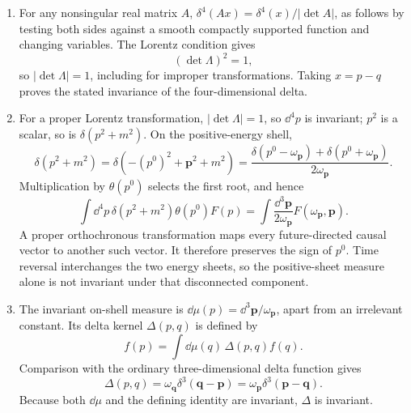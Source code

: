 
\begin{enumerate}
\begin{enumerate}
\item
For any nonsingular real matrix \(A\),
\(\delta^4(Ax)=\delta^4(x)/|\det A|\), as follows by testing both sides
against a smooth compactly supported function and changing variables.
The Lorentz condition gives
\[
 (\det\Lambda)^2=1,
\]
so \(|\det\Lambda|=1\), including for improper transformations.  Taking
\(x=p-q\) proves the stated invariance of the four-dimensional delta.
\item
For a proper Lorentz transformation,
\(\lvert\det\Lambda\rvert=1\), so \(\dd^4p\) is invariant; \(p^2\) is a
scalar, so is \(\delta(p^2+m^2)\).  On the positive-energy shell,
\[
 \delta(p^2+m^2)
 =\delta\!\left(-(p^0)^2+\mathbf p^2+m^2\right)
 =\frac{\delta(p^0-\omega_{\mathbf p})+\delta(p^0+\omega_{\mathbf p})}
 {2\omega_{\mathbf p}}.
\]
Multiplication by \(\theta(p^0)\) selects the first root, and hence
\[
 \int \dd^4p\,\delta(p^2+m^2)\theta(p^0)F(p)
 =\int\frac{\dd^3\mathbf p}{2\omega_{\mathbf p}}F(\omega_{\mathbf p},\mathbf p).
\]
A proper orthochronous transformation maps every future-directed causal
vector to another such vector.  It therefore preserves the sign of \(p^0\).
Time reversal interchanges the two energy sheets, so the positive-sheet
measure alone is not invariant under that disconnected component.
\item
The invariant on-shell measure is \(\dd\mu(p)=\dd^3\mathbf p/\omega_{\mathbf p}\),
apart from an irrelevant constant.  Its delta kernel \(\Delta(p,q)\) is
defined by
\[
 f(p)=\int \dd\mu(q)\,\Delta(p,q)f(q).
\]
Comparison with the ordinary three-dimensional delta function gives
\[
 \Delta(p,q)=\omega_{\mathbf q}\delta^3(\mathbf q-\mathbf p)
            =\omega_{\mathbf p}\delta^3(\mathbf p-\mathbf q).
\]
Because both \(\dd\mu\) and the defining identity are invariant, \(\Delta\)
is invariant.


\end{enumerate}
\end{enumerate}
